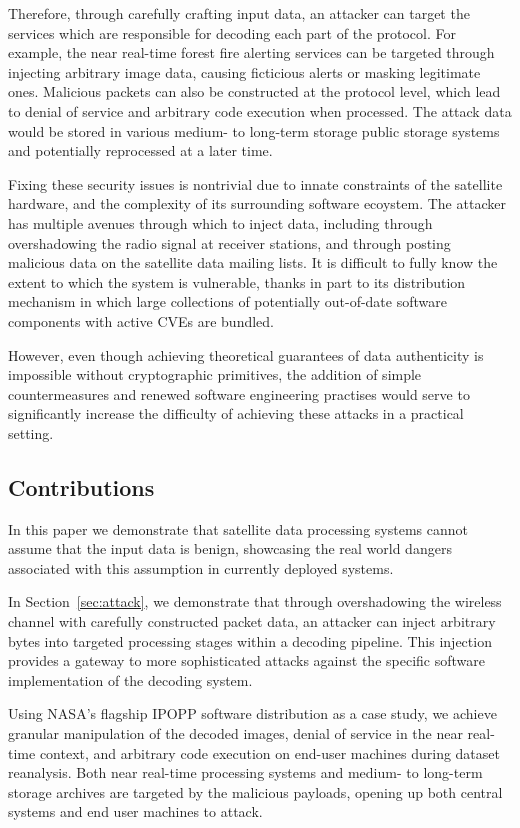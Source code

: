 Therefore, through carefully crafting input data, an attacker can target the services which are responsible for decoding each part of the protocol.
For example, the near real-time forest fire alerting services can be targeted through injecting arbitrary image data, causing ficticious alerts or masking legitimate ones.
Malicious packets can also be constructed at the protocol level, which lead to denial of service and arbitrary code execution when processed.
The attack data would be stored in various medium- to long-term storage public storage systems and potentially reprocessed at a later time.

Fixing these security issues is nontrivial due to innate constraints of the satellite hardware, and the complexity of its surrounding software ecoystem.
The attacker has multiple avenues through which to inject data, including through overshadowing the radio signal at receiver stations, and through posting malicious data on the satellite data mailing lists.
It is difficult to fully know the extent to which the system is vulnerable, thanks in part to its distribution mechanism in which large collections of potentially out-of-date software components with active CVEs are bundled.

However, even though achieving theoretical guarantees of data authenticity is impossible without cryptographic primitives, the addition of simple countermeasures and renewed software engineering practises would serve to significantly increase the difficulty of achieving these attacks in a practical setting.

\subsection{Contributions}

In this paper we demonstrate that satellite data processing systems cannot assume that the input data is benign, showcasing the real world dangers associated with this assumption in currently deployed systems.

In Section~\ref{sec:attack}, we demonstrate that through overshadowing the wireless channel with carefully constructed packet data, an attacker can inject arbitrary bytes into targeted processing stages within a decoding pipeline.
This injection provides a gateway to more sophisticated attacks against the specific software implementation of the decoding system.

Using NASA's flagship IPOPP software distribution as a case study, we achieve granular manipulation of the decoded images, denial of service in the near real-time context, and arbitrary code execution on end-user machines during dataset reanalysis.
Both near real-time processing systems and medium- to long-term storage archives are targeted by the malicious payloads, opening up both central systems and end user machines to attack.

